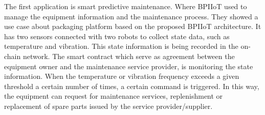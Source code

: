 \documentclass[runningheads]{llncs}
\begin{document}
\noindent 
The first application is smart predictive maintenance. Where BPIIoT used to manage the equipment information and the maintenance process. They showed a use case about packaging platform based on the proposed BPIIoT architecture. It has two sensors connected with two robots to collect state data, such as temperature and vibration. This state information is being recorded in the on-chain network. The smart contract which serve as agreement between the equipment owner and the maintenance service provider, is monitoring the state information. When the temperature or vibration frequency exceeds a given threshold a certain number of times, a certain command is triggered. In this way, the equipment can request for maintenance services, replenishment or replacement of spare parts issued by the service provider/supplier.








\newpage


\end{document}
